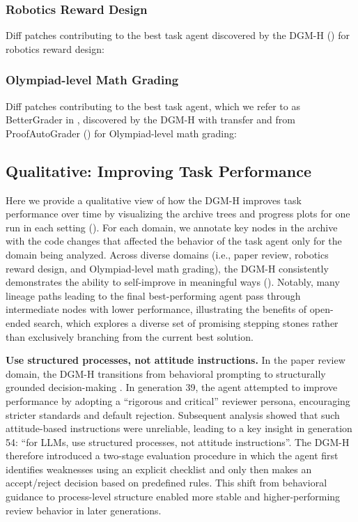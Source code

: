 \documentclass[]{fairmeta}
\begin{document}
\subsubsection{Robotics Reward Design}
\label{app:best-agents-genesis}
Diff patches contributing to the best task agent discovered by the DGM-H () for robotics reward design:


\subsubsection{Olympiad-level Math Grading}
\label{app:best-agents-imograding}
Diff patches contributing to the best task agent, which we refer to as BetterGrader in , discovered by the DGM-H with transfer and from ProofAutoGrader () for Olympiad-level math grading:


\subsection{Qualitative: Improving Task Performance}
\label{app:qual-task}

Here we provide a qualitative view of how the DGM-H improves task performance over time by visualizing the archive trees and progress plots for one run in each setting (). For each domain, we annotate key nodes in the archive with the code changes that affected the behavior of the task agent only for the domain being analyzed. Across diverse domains (i.e., paper review, robotics reward design, and Olympiad-level math grading), the DGM-H consistently demonstrates the ability to self-improve in meaningful ways (). Notably, many lineage paths leading to the final best-performing agent pass through intermediate nodes with lower performance, illustrating the benefits of open-ended search, which explores a diverse set of promising stepping stones rather than exclusively branching from the current best solution.

\textbf{Use structured processes, not attitude instructions.} In the paper review domain, the DGM-H transitions from behavioral prompting to structurally grounded decision-making . In generation 39, the agent attempted to improve performance by adopting a ``rigorous and critical'' reviewer persona, encouraging stricter standards and default rejection. Subsequent analysis showed that such attitude-based instructions were unreliable, leading to a key insight in generation 54: ``for LLMs, use structured processes, not attitude instructions''. The DGM-H therefore introduced a two-stage evaluation procedure in which the agent first identifies weaknesses using an explicit checklist and only then makes an accept/reject decision based on predefined rules. This shift from behavioral guidance to process-level structure enabled more stable and higher-performing review behavior in later generations.
\end{document}
